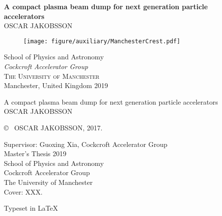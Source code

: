 \newpage
{}	%
\thispagestyle{empty}
\begin{center}
	\textbf{\Huge A compact plasma beam dump for next generation particle accelerators} \\[1cm]
	{\large OSCAR JAKOBSSON}
	
	\vfill	
	\begin{figure}[H]
	\centering
	\texttt{[image: figure/auxiliary/ManchesterCrest.pdf]} \\	
	\end{figure}	\vspace{5mm}	
	
	School of Physics and Astronomy \\
	\textit{Cockcroft Accelerator Group}\\
	\textsc{The University of Manchester} \\
	Manchester, United Kingdom 2019 \\
\end{center}


\newpage
\thispagestyle{plain}
\vspace*{4.5cm}
A compact plasma beam dump for next generation particle accelerators\\
OSCAR JAKOBSSON \setlength{\parskip}{1cm}

\copyright ~ OSCAR JAKOBSSON, 2017. \setlength{\parskip}{1cm}

Supervisor: Guoxing Xia, Cockcroft Accelerator Group\\

Master's Thesis 2019\\	%
School of Physics and Astronomy\\
Cockcroft Accelerator Group\\
The University of Manchester\\

\vfill
Cover: XXX. \setlength{\parskip}{0.5cm}

Typeset in \LaTeX \\

